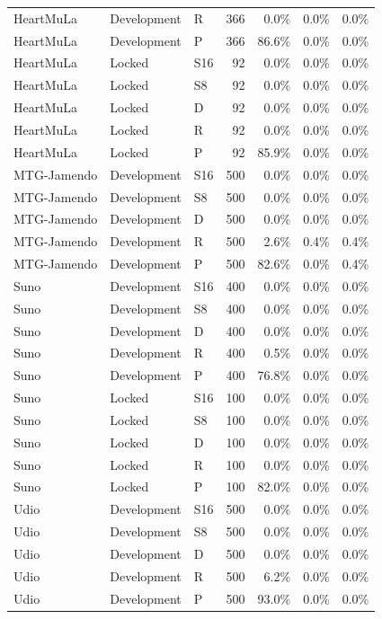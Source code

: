 \begin{longtable}{lllrrrr}
HeartMuLa & Development & R & 366 & 0.0\% & 0.0\% & 0.0\% \\
HeartMuLa & Development & P & 366 & 86.6\% & 0.0\% & 0.0\% \\
HeartMuLa & Locked & S16 & 92 & 0.0\% & 0.0\% & 0.0\% \\
HeartMuLa & Locked & S8 & 92 & 0.0\% & 0.0\% & 0.0\% \\
HeartMuLa & Locked & D & 92 & 0.0\% & 0.0\% & 0.0\% \\
HeartMuLa & Locked & R & 92 & 0.0\% & 0.0\% & 0.0\% \\
HeartMuLa & Locked & P & 92 & 85.9\% & 0.0\% & 0.0\% \\
MTG-Jamendo & Development & S16 & 500 & 0.0\% & 0.0\% & 0.0\% \\
MTG-Jamendo & Development & S8 & 500 & 0.0\% & 0.0\% & 0.0\% \\
MTG-Jamendo & Development & D & 500 & 0.0\% & 0.0\% & 0.0\% \\
MTG-Jamendo & Development & R & 500 & 2.6\% & 0.4\% & 0.4\% \\
MTG-Jamendo & Development & P & 500 & 82.6\% & 0.0\% & 0.4\% \\
Suno & Development & S16 & 400 & 0.0\% & 0.0\% & 0.0\% \\
Suno & Development & S8 & 400 & 0.0\% & 0.0\% & 0.0\% \\
Suno & Development & D & 400 & 0.0\% & 0.0\% & 0.0\% \\
Suno & Development & R & 400 & 0.5\% & 0.0\% & 0.0\% \\
Suno & Development & P & 400 & 76.8\% & 0.0\% & 0.0\% \\
Suno & Locked & S16 & 100 & 0.0\% & 0.0\% & 0.0\% \\
Suno & Locked & S8 & 100 & 0.0\% & 0.0\% & 0.0\% \\
Suno & Locked & D & 100 & 0.0\% & 0.0\% & 0.0\% \\
Suno & Locked & R & 100 & 0.0\% & 0.0\% & 0.0\% \\
Suno & Locked & P & 100 & 82.0\% & 0.0\% & 0.0\% \\
Udio & Development & S16 & 500 & 0.0\% & 0.0\% & 0.0\% \\
Udio & Development & S8 & 500 & 0.0\% & 0.0\% & 0.0\% \\
Udio & Development & D & 500 & 0.0\% & 0.0\% & 0.0\% \\
Udio & Development & R & 500 & 6.2\% & 0.0\% & 0.0\% \\
Udio & Development & P & 500 & 93.0\% & 0.0\% & 0.0\% \\

\end{longtable}
